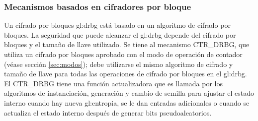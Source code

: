 %
%
\subsubsection{Mecanismos basados en cifradores por bloque}

Un cifrado por bloques \gls{gl:drbg} está basado en un algoritmo de cifrado por
bloques. La seguridad que puede alcanzar el \gls{gl:drbg} depende del cifrado
por bloques y el tamaño de llave utilizado. Se tiene al mecanismo CTR\_DRBG,
que utiliza un cifrado por bloques aprobado con el modo de operación de
contador (véase sección \ref{sec:modos}); debe utilizarse el mismo algoritmo
de cifrado y tamaño de llave para todas las operaciones de cifrado por bloques
en el \gls{gl:drbg}. El CTR\_DRBG tiene una función actualizadora que es llamada
por los algoritmos de instanciación, generación y cambio de semilla para ajustar
el estado interno cuando hay nueva \gls{gl:entropia}, se le dan entradas
adicionales o cuando se actualiza el estado interno después de generar bits
pseudoaleatorios.
